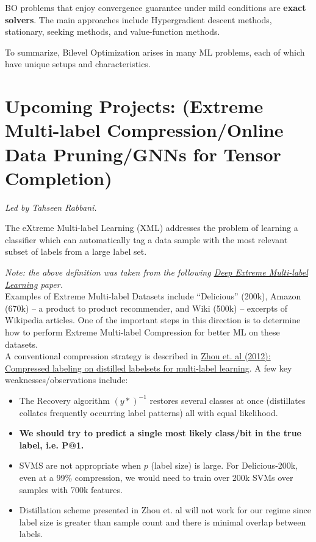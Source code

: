 \documentclass[12pt]{amsart}
\begin{document}
\begin{definition}BO problems that enjoy convergence guarantee under mild conditions are \textbf{exact solvers}. The main approaches include Hypergradient descent methods, stationary, seeking methods, and value-function methods.
\end{definition}

To summarize, Bilevel Optimization arises in many ML problems, each of which have unique setups and characteristics.

\newpage

\section{Upcoming Projects: (Extreme Multi-label Compression/Online Data Pruning/GNNs for Tensor Completion)}

\textit{Led by Tahseen Rabbani.} \\

\begin{definition}
The eXtreme Multi-label Learning (XML) addresses the problem
of learning a classifier which can automatically tag a data sample
with the most relevant subset of labels from a large label set. 
\end{definition}

\textit{Note: the above definition was taken from the following \href{https://arxiv.org/pdf/1704.03718.pdf}{Deep Extreme Multi-label Learning} paper.} \\

Examples of Extreme Multi-label Datasets include ``Delicious'' (200k), Amazon (670k) -- a product to product recommender, and Wiki (500k) -- excerpts of Wikipedia articles. One of the important steps 
in this direction is to determine how to perform Extreme Multi-label Compression for better ML on these datasets. \\

A conventional compression strategy is described in \href{https://link.springer.com/article/10.1007/s10994-011-5276-1}{Zhou et. al (2012): Compressed labeling on distilled labelsets for multi-label learning}. 
A few key weaknesses/observations include:
\begin{itemize}
\item The Recovery algorithm $(y*)^{-1}$ restores several classes at once (distillates collates frequently occurring label patterns) all with equal likelihood.
\item \textbf{We should try to predict a single most likely class/bit in the true label, i.e. P@1.}
\item SVMS are not appropriate when $p$ (label size) is large. For Delicious-200k, even at a 99\% compression, we would need to train over 200k SVMs over samples with 700k features.
\item Distillation scheme presented in Zhou et. al will not work for our regime since label size is greater than sample count and there is minimal overlap between labels.
\end{itemize}
\end{document}
